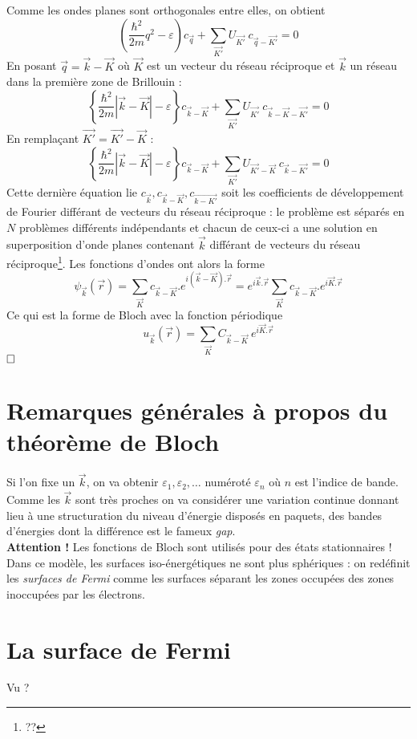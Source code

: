 	Comme les ondes planes sont orthogonales entre elles, on obtient
	\begin{equation}
	\left(\frac{\hbar^2}{2m}q^2
	-\varepsilon\right)c_{\vec{q}} + \sum_{\vec{K'}}U_{\vec{K'}}\ c_{\vec{
	q}-\vec{K'}}=0
	\end{equation}
	En posant $\vec{q}=\vec{k}-\vec{K}$ où $\vec{K}$ est un vecteur du 
	réseau réciproque et $\vec{k}$ un réseau dans la première zone de 
	Brillouin :
	\begin{equation}
	\left\{\frac{\hbar^2}{2m}|\vec{k}-\vec{K}|-\varepsilon\right\}c_{
	\vec{k}-\vec{K}}+\sum_{\vec{K'}}U_{\vec{K'}}\ c_{\vec{k}-\vec{K}-
	\vec{K'}}=0
	\end{equation}
	En remplaçant $\vec{K'} = \vec{K'}-\vec{K}$ :
	\begin{equation}
	\left\{\frac{\hbar^2}{2m}|\vec{k}-\vec{K}|-\varepsilon\right\}c_{
	\vec{k}-\vec{K}}+\sum_{\vec{K'}}U_{\vec{K'}-\vec{K}}\ c_{\vec{k}-\vec{K'}
	}=0
	\end{equation}	
	Cette dernière équation lie $c_{\vec{k}}, c_{\vec{k}-\vec{K}}, c_{
	\vec{k-K'}}$ soit les coefficients de développement de Fourier 
	différant de vecteurs du réseau réciproque : le problème est séparés 
	en $N$ problèmes différents indépendants et chacun de ceux-ci a une 
	solution en superposition d'onde planes contenant $\vec{k}$ différant 
	de vecteurs du réseau réciproque\footnote{??}. Les fonctions d'ondes 
	ont alors la forme 
	\begin{equation}
	\psi_{\vec{k}}(\vec{r}) = \sum_{\vec{K}}c_{\vec{k}-\vec{K}}.e^{i(\vec{k}
	-\vec{K}).\vec{r}} = e^{i\vec{k}.\vec{r}}\sum_{\vec{K}}c_{\vec{k}-
	\vec{K}}.e^{i\vec{K}.\vec{r}}
	\end{equation}
	Ce qui est la forme de Bloch avec la fonction périodique 
	\begin{equation}
	u_{\vec{k}}(\vec{r}) = \sum_{\vec{K}}C_{\vec{k}-\vec{K}}\ e^{i\vec{K}.
	\vec{r}}
	\end{equation}
	$\hfill\square$
	
	\section{Remarques générales à propos du théorème de Bloch}
	Si l'on fixe un $\vec k$, on va obtenir $\varepsilon_1,\varepsilon_2, 
	\dots$ numéroté $\varepsilon_n$ où $n$ est l'indice de bande. Comme 
	les $\vec{k}$ sont très proches on va considérer une variation continue 
	donnant lieu à une structuration du niveau d'énergie disposés en 
	paquets, des bandes d'énergies dont la différence est le fameux 
	\textit{gap}.\\
	
	\textbf{Attention !} Les fonctions de Bloch sont utilisés pour des 
	états stationnaires ! Dans ce modèle, les surfaces iso-énergétiques ne 
	sont plus sphériques : on redéfinit les \textit{surfaces de Fermi} 
	comme les surfaces séparant les zones occupées des zones inoccupées 
	par les électrons.
	
	\section{La surface de Fermi}
	Vu ?